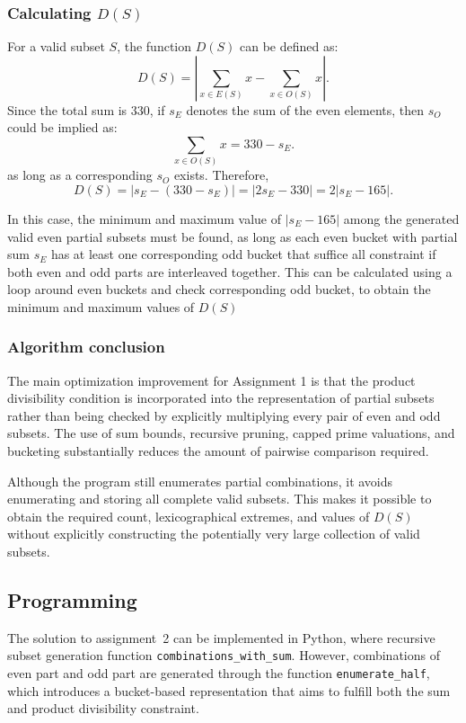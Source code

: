 \documentclass[11pt,a4paper]{article}
\begin{document}
\subsubsection*{Calculating $D(S)$}

For a valid subset $S$, the function $D(S)$ can be defined as:
\[
D(S)
=
\left|
\sum_{x\in E(S)}x-\sum_{x\in O(S)}x
\right|.
\]
Since the total sum is $330$, if $s_E$ denotes the sum of the even elements, then $s_O$ could be implied as:
\[
\sum_{x\in O(S)}x=330-s_E.
\]
as long as a corresponding $s_O$ exists.
Therefore,
\[
D(S)
=
|s_E-(330-s_E)|
=
|2s_E-330|
=
2|s_E-165|.
\]

In this case, the minimum and maximum value of $|s_E-165|$ among the generated valid even partial subsets must be found, as long as each even bucket with partial sum $s_E$ has at least one corresponding odd bucket that suffice all constraint if both even and odd parts are interleaved together. This can be calculated using a loop around even buckets and check corresponding odd bucket, to obtain the minimum and maximum values of $D(S)$

\subsubsection*{Algorithm conclusion}

The main optimization improvement for Assignment 1 is that the product divisibility condition is incorporated into the representation of partial subsets rather than being checked by explicitly multiplying every pair of even and odd subsets. The use of sum bounds, recursive pruning, capped prime
valuations, and bucketing substantially reduces the amount of pairwise comparison required.

Although the program still enumerates partial combinations, it avoids enumerating and storing all complete valid subsets. This makes it possible to obtain the required count, lexicographical extremes, and values of $D(S)$ without explicitly constructing the potentially very large collection of valid subsets.

\subsection*{Programming}

The solution to assignment~2 can be implemented in Python, where recursive subset generation function \texttt{combinations\_with\_sum}. However, combinations of even part and odd part are generated through the function \texttt{enumerate\_half}, which introduces a bucket-based representation that aims to fulfill both the sum and product divisibility constraint.
\end{document}
